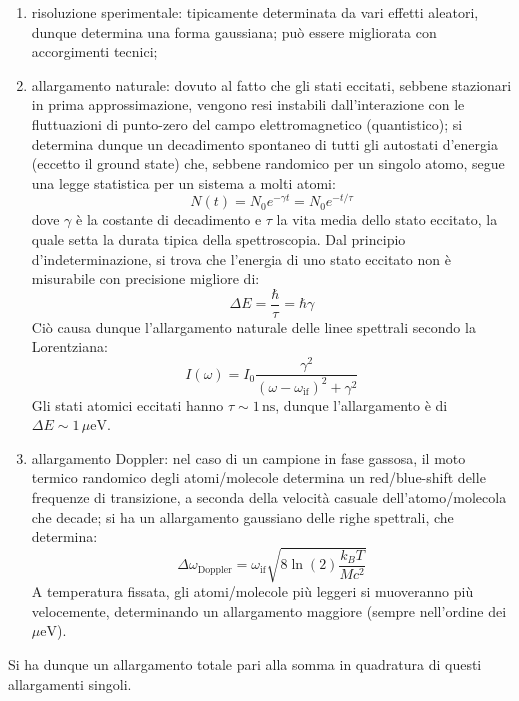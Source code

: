 \begin{enumerate}
	\item risoluzione sperimentale: tipicamente determinata da vari effetti aleatori, dunque determina una forma gaussiana; può essere migliorata con accorgimenti tecnici;
	\item allargamento naturale: dovuto al fatto che gli stati eccitati, sebbene stazionari in prima approssimazione, vengono resi instabili dall'interazione con le fluttuazioni di punto-zero del campo elettromagnetico (quantistico); si determina dunque un decadimento spontaneo di tutti gli autostati d'energia (eccetto il ground state) che, sebbene randomico per un singolo atomo, segue una legge statistica per un sistema a molti atomi:
	\begin{equation*}
		N(t) = N_0 e^{- \gamma t} = N_0 e^{- t / \tau}
	\end{equation*}
	dove $ \gamma $ è la costante di decadimento e $ \tau $ la vita media dello stato eccitato, la quale setta la durata tipica della spettroscopia. Dal principio d'indeterminazione, si trova che l'energia di uno stato eccitato non è misurabile con precisione migliore di:
	\begin{equation*}
		\Delta E = \frac{\hbar}{\tau} = \hbar \gamma
	\end{equation*}
	Ciò causa dunque l'allargamento naturale delle linee spettrali secondo la Lorentziana:
	\begin{equation*}
		I(\omega) = I_0 \frac{\gamma^2}{(\omega - \omega_\text{if})^2 + \gamma^2}
	\end{equation*}
	Gli stati atomici eccitati hanno $ \tau \sim 1\,\text{ns} $, dunque l'allargamento è di $ \Delta E \sim 1\,\mu\text{eV} $.
	\item allargamento Doppler: nel caso di un campione in fase gassosa, il moto termico randomico degli atomi/molecole determina un red/blue-shift delle frequenze di transizione, a seconda della velocità casuale dell'atomo/molecola che decade; si ha un allargamento gaussiano delle righe spettrali, che determina:
	\begin{equation*}
		\Delta \omega_\text{Doppler} = \omega_\text{if} \sqrt{8 \ln(2) \frac{k_B T}{M c^2}}
	\end{equation*}
	A temperatura fissata, gli atomi/molecole più leggeri si muoveranno più velocemente, determinando un allargamento maggiore (sempre nell'ordine dei $ \mu\text{eV} $).
\end{enumerate}
Si ha dunque un allargamento totale pari alla somma in quadratura di questi allargamenti singoli.










